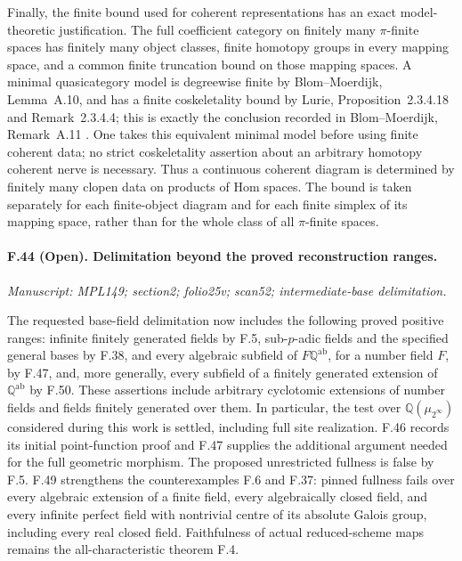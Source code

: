 Finally, the finite bound used for coherent representations has an
exact model-theoretic justification. The full coefficient category on
finitely many $\pi$-finite spaces has finitely many object classes,
finite homotopy groups in every mapping space, and a common finite
truncation bound on those mapping spaces. A minimal quasicategory
model is degreewise finite by Blom--Moerdijk, Lemma~A.10, and has a
finite coskeletality bound by Lurie, Proposition~2.3.4.18 and
Remark~2.3.4.4; this is exactly the conclusion recorded in
Blom--Moerdijk, Remark~A.11
\citep{FA_BlomMoerdijk2023,FA_LurieHTT2009}.
One takes this equivalent minimal model before using finite coherent
data; no strict coskeletality assertion about an arbitrary homotopy
coherent nerve is necessary. Thus a continuous coherent diagram is
determined by finitely many clopen data on products of Hom spaces.
The bound is taken separately for each finite-object diagram and for
each finite simplex of its mapping space, rather than for the whole
class of all $\pi$-finite spaces.

\paragraph{F.44 (Open). Delimitation beyond the proved reconstruction ranges.}
\textit{Manuscript: MPL149; section2; folio25v; scan52; intermediate-base delimitation.}

The requested base-field delimitation now includes the following
proved positive ranges: infinite finitely generated fields by F.5,
sub-$p$-adic fields and the specified general bases by F.38, and
every algebraic subfield of $F\mathbb Q^{\mathrm{ab}}$, for a
number field $F$, by F.47, and, more generally, every subfield of
a finitely generated extension of $\mathbb Q^{\mathrm{ab}}$ by
F.50. These assertions include arbitrary cyclotomic extensions of
number fields and fields finitely generated over them. In particular, the test
over $\mathbb Q(\mu_{2^\infty})$ considered during this work is
settled, including full site realization. F.46 records its initial
point-function proof and F.47 supplies the additional argument
needed for the full geometric morphism. The proposed unrestricted
fullness is false by F.5. F.49 strengthens the counterexamples
F.6 and F.37: pinned fullness fails over every algebraic extension
of a finite field, every algebraically closed field, and every
infinite perfect field with nontrivial centre of its absolute
Galois group, including every real closed field.
Faithfulness of actual reduced-scheme maps remains
the all-characteristic theorem F.4.

